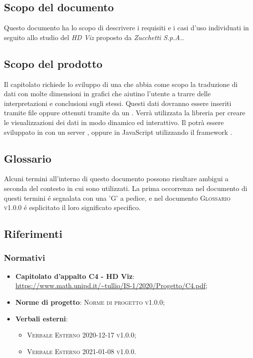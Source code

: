 \documentclass[../analisi_dei_requisiti.tex]{subfiles}
\begin{document}
\subsection{Scopo del documento}%
\label{sub:scopo_del_documento}
Questo documento ha lo scopo di descrivere i requisiti e i casi d'uso individuati in seguito allo studio del  \emph{HD Viz} proposto da \emph{Zucchetti S.p.A.}. 

\subsection{Scopo del prodotto}%
\label{sub:scopo_del_prodotto}
Il capitolato richiede lo sviluppo di una  che abbia come scopo la 
traduzione di dati con molte dimensioni in grafici che aiutino l’utente a trarre delle interpretazioni e conclusioni sugli stessi. 
Questi dati dovranno essere inseriti tramite file  oppure ottenuti tramite  da un .
Verrà utilizzata la libreria   per creare le visualizzazioni dei dati in modo dinamico ed interattivo.
Il  potrà essere sviluppato in  con un server ,  oppure 
in JavaScript utilizzando il framework . 


\subsection{Glossario}
\label{sub:glossario}
Alcuni termini all'interno di questo documento possono risultare ambigui a seconda del contesto in cui sono utilizzati.
La prima occorrenza nel documento di questi termini é segnalata con una 'G' a pedice, e nel documento 
\textsc{Glossario v1.0.0} é esplicitato il loro significato specifico.


\subsection{Riferimenti}
\label{sub:riferimenti}

\subsubsection{Normativi}%
\label{ssub:normativi}


\begin{itemize}
  \item \textbf{Capitolato d'appalto C4 - HD Viz}: \\
  \url{https://www.math.unipd.it/~tullio/IS-1/2020/Progetto/C4.pdf};
  \item \textbf{Norme di progetto}: \textsc{Norme di progetto v1.0.0};
  \item \textbf{Verbali esterni}:
  \begin{itemize}
    \item \textsc{Verbale Esterno 2020-12-17 v1.0.0};
    \item \textsc{Verbale Esterno 2021-01-08 v1.0.0}.
  \end{itemize}
\end{itemize}
\end{document}
